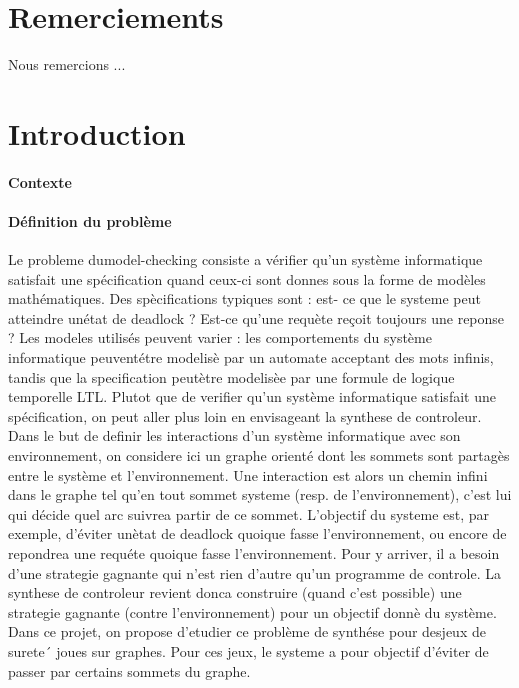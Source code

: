 \documentclass[12pt,a4paper,oneside,titlepage]{report}
\begin{document}

{}
\chapter*{Remerciements}
\renewcommand{\leftmark}{REMERCIEMENTS}

Nous remercions ...\\

\newpage
\renewcommand{\leftmark}{TABLE DES MATI\`{E}RES}
\thispagestyle{fancy}
\tableofcontents


\newpage
{}
\renewcommand{\leftmark}{INTRODUCTION}
\chapter{Introduction}
\subsubsection*{Contexte}
\subsubsection*{Définition du problème}
Le probleme dumodel-checking consiste a vérifier qu’un système informatique satisfait une spécification
quand ceux-ci sont donnes sous la forme de modèles mathématiques. Des spècifications typiques sont : est-
ce que le systeme peut atteindre unétat de deadlock ? Est-ce qu’une requète reçoit toujours une reponse ?
Les modeles utilisés peuvent varier : les comportements du système informatique peuventétre modelisè
par un automate acceptant des mots infinis, tandis que la specification peutètre modelisèe par une formule
de logique temporelle LTL.
Plutot que de verifier qu’un système informatique satisfait une spécification, on peut aller plus loin en
envisageant la synthese de controleur. Dans le but de definir les interactions d’un système informatique
avec son environnement, on considere ici un graphe orienté dont les sommets sont partagès entre le système
et l’environnement. Une interaction est alors un chemin infini dans le graphe tel qu’en tout sommet 
systeme (resp. de l’environnement), c’est lui qui décide quel arc suivrea partir de ce sommet. L’objectif
du systeme est, par exemple, d’éviter unètat de deadlock quoique fasse l’environnement, ou encore de
repondrea une requéte quoique fasse l’environnement. Pour y arriver, il a besoin d’une strategie gagnante
qui n’est rien d’autre qu’un programme de controle. La synthese de controleur revient donca construire
(quand c’est possible) une strategie gagnante (contre l’environnement) pour un objectif donnè du système.
Dans ce projet, on propose d’etudier ce problème de synthése pour desjeux de surete´ joues sur graphes.
Pour ces jeux, le systeme a pour objectif d’éviter de passer par certains sommets du graphe.  
\end{document}
